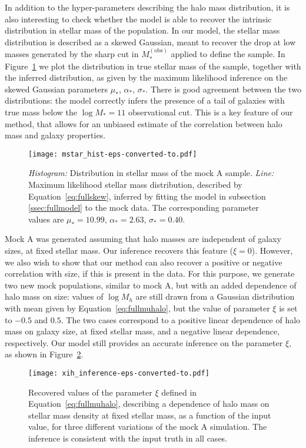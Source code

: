 \documentclass[usenatbib]{mnras}
\def\mobs{M_*^{\mathrm{(obs)}}}
\def\mstar{M_*}
\def\mhalo{M_{h}}
\def\Fref#1{Figure~\ref{#1}\xspace}
\def\Eref#1{Equation~\ref{#1}\xspace}
\begin{document}
In addition to the hyper-parameters describing the halo mass distribution, it is also interesting to check whether the model is able to recover the intrinsic distribution in stellar mass of the population.
In our model, the stellar mass distribution is described as a skewed Gaussian, meant to recover the drop at low masses generated by the sharp cut in $\mobs$ applied to define the sample.
In \Fref{fig:mstar} we plot the distribution in true stellar mass of the sample, together with the inferred distribution, as given by the maximum likelihood inference on the skewed Gaussian parameters $\mu_*$, $\alpha_*$, $\sigma_*$.
There is good agreement between the two distributions: the model correctly infers the presence of a tail of galaxies with true mass below the $\log{\mstar}=11$ observational cut. This is a key feature of our method, that allows for an unbiased estimate of the correlation between halo mass and galaxy properties.
%
\begin{figure}
 \texttt{[image: mstar\_hist-eps-converted-to.pdf]}
 \caption{{\em Histogram:} Distribution in stellar mass of the mock A sample. {\em Line:} Maximum likelihood stellar mass distribution, described by \Eref{eq:fullskew}, inferred by fitting the model in subsection \ref{ssec:fullmodel} to the mock data. The corresponding parameter values are $\mu_*=10.99$, $\alpha_*=2.63$, $\sigma_*=0.40$.}
 \label{fig:mstar}
\end{figure}
%

Mock A was generated assuming that halo masses are independent of galaxy sizes, at fixed stellar mass. Our inference recovers this feature ($\xi=0$). However, we also wish to show that our method can also recover a positive or negative correlation with size, if this is present in the data. 
For this purpose, we generate two new mock populations, similar to mock A, but with an added dependence of halo mass on size: values of $\log{\mhalo}$ are still drawn from a Gaussian distribution with mean given by \Eref{eq:fullmuhalo}, but the value of parameter $\xi$ is set to $-0.5$ and $0.5$.
The two cases correspond to a positive linear dependence of halo mass on galaxy size, at fixed stellar mass, and a negative linear dependence, respectively.
Our model still provides an accurate inference on the parameter $\xi$, as shown in \Fref{fig:xipar}.
%
\begin{figure}
 \texttt{[image: xih\_inference-eps-converted-to.pdf]}
 \caption{Recovered values of the parameter $\xi$ defined in \Eref{eq:fullmuhalo}, describing a dependence of halo mass on stellar mass density at fixed stellar mass, as a function of the input value, for three different variations of the mock A simulation. The inference is consistent with the input truth in all cases.}
 \label{fig:xipar}
\end{figure}
%
\end{document}
